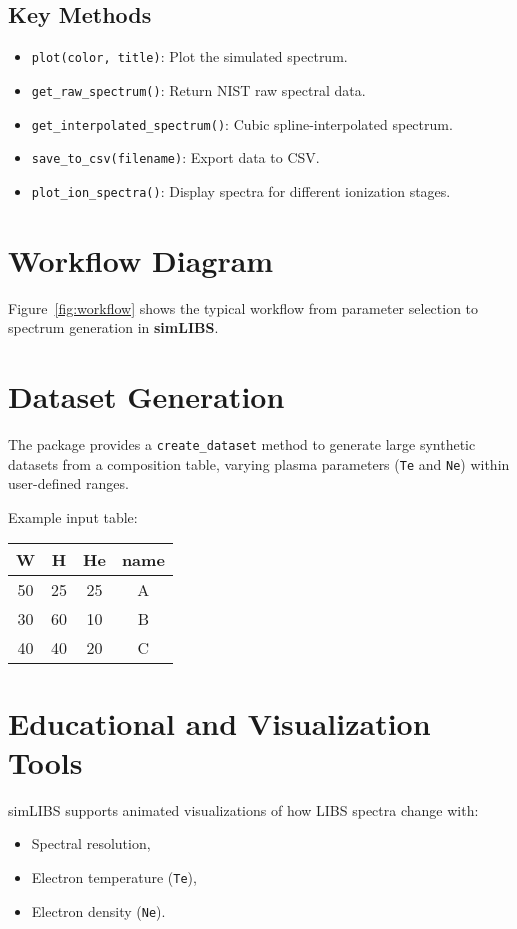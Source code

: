 \documentclass[12pt,a4paper]{article}
\begin{document}
	\subsection{Key Methods}
	\begin{itemize}
		\item \verb|plot(color, title)|: Plot the simulated spectrum.
		\item \verb|get_raw_spectrum()|: Return NIST raw spectral data.
		\item \verb|get_interpolated_spectrum()|: Cubic spline-interpolated spectrum.
		\item \verb|save_to_csv(filename)|: Export data to CSV.
		\item \verb|plot_ion_spectra()|: Display spectra for different ionization stages.
	\end{itemize}
	
	\section{Workflow Diagram}
	Figure~\ref{fig:workflow} shows the typical workflow from parameter selection to spectrum generation in \textbf{simLIBS}.
	

	
	\section{Dataset Generation}
	The package provides a \texttt{create\_dataset} method to generate large synthetic datasets from a composition table, varying plasma parameters (\texttt{Te} and \texttt{Ne}) within user-defined ranges.
	
	Example input table:
	
	\begin{center}
		\begin{tabular}{cccc}
			\toprule
			W & H & He & name \\
			\midrule
			50 & 25 & 25 & A \\
			30 & 60 & 10 & B \\
			40 & 40 & 20 & C \\
			\bottomrule
		\end{tabular}
	\end{center}
	
	\section{Educational and Visualization Tools}
	simLIBS supports animated visualizations of how LIBS spectra change with:
	\begin{itemize}
		\item Spectral resolution,
		\item Electron temperature (\texttt{Te}),
		\item Electron density (\texttt{Ne}).
	\end{itemize}
	
\end{document}
